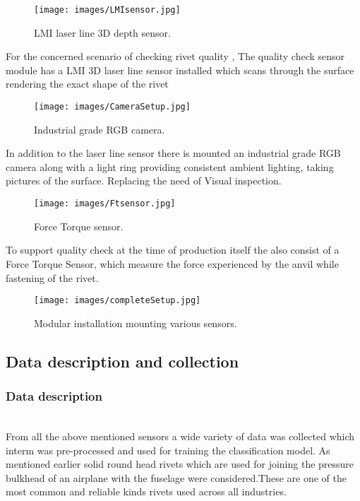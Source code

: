 \documentclass{article}
\begin{document}
\begin{figure}[H]
        \centering
        \texttt{[image: images/LMIsensor.jpg]}
        \caption{LMI laser line 3D depth sensor.}
         \label{fig:LMIsensor}
        \end{figure}

For the concerned scenario of checking rivet quality , The quality check sensor module has a LMI 3D laser line sensor installed which scans through the surface rendering the exact shape of the rivet\\


\begin{figure}[H]
        \centering
        \texttt{[image: images/CameraSetup.jpg]}
        \caption{Industrial grade RGB camera. }
         \label{fig:cameraSetup}
        \end{figure}
        
In addition to the laser line sensor there is mounted an industrial grade RGB camera along with a light ring providing consistent ambient lighting, taking pictures of the surface. Replacing the need of Visual inspection.\\


\begin{figure}[H]
        \centering
        \texttt{[image: images/Ftsensor.jpg]}
        \caption{Force Torque sensor. }
         \label{fig Sensor}
        \end{figure}

To support quality check at the time of production itself the also consist of a Force Torque Sensor, which measure the force experienced by the anvil while fastening of the rivet.

\begin{figure}[H]
        \centering
        \texttt{[image: images/completeSetup.jpg]}
        \caption{Modular installation mounting various sensors. }
         \label{fig:ModularSensorMounting}
        \end{figure}


\subsection{Data description and collection}

\subsubsection{Data description}\\
From all the above mentioned sensors a wide variety of data was collected which interm was pre-processed and used for training the classification model.
As mentioned earlier solid round head  rivets which are used for joining the pressure  bulkhead of an airplane with the fuselage were considered.These are one of the most common and reliable kinds rivets used across all industries. \\
\end{document}
